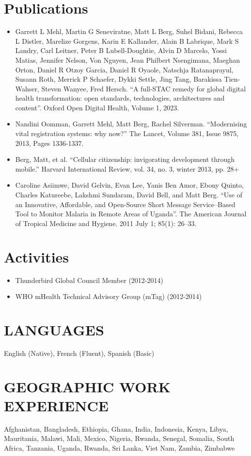 \documentclass{res}
\begin{document}
\begin{resume}
\section{Publications}
\begin{itemize} \itemsep -2pt
	\item Garrett L Mehl, Martin G Seneviratne, Matt L Berg, Suhel Bidani, Rebecca L Distler, Marelize Gorgens, Karin E Kallander, Alain B Labrique, Mark S Landry, Carl Leitner, Peter B Lubell-Doughtie, Alvin D Marcelo, Yossi Matias, Jennifer Nelson, Von Nguyen, Jean Philbert Nsengimana, Maeghan Orton, Daniel R Otzoy Garcia, Daniel R Oyaole, Natschja Ratanaprayul, Susann Roth, Merrick P Schaefer, Dykki Settle, Jing Tang, Barakissa Tien-Wahser, Steven Wanyee, Fred Hersch. ``A full-STAC remedy for global digital health transformation: open standards, technologies, architectures and content''. Oxford Open Digital Health, Volume 1, 2023. 
	\item Nandini Oomman, Garrett Mehl, Matt Berg, Rachel Silverman. ``Modernising vital registration systems: why now?'' The Lancet, Volume 381, Issue 9875, 2013, Pages 1336-1337.
	\item Berg, Matt, et al.  ``Cellular citizenship: invigorating development through mobile.'' Harvard International Review, vol. 34, no. 3, winter 2013, pp. 28+
	\item Caroline Asiimwe, David Gelvin, Evan Lee, Yanis Ben Amor, Ebony Quinto, Charles Katureebe, Lakshmi Sundaram, David Bell, and Matt Berg. ``Use of an Innovative, Affordable, and Open-Source Short Message Service–Based Tool to Monitor Malaria in Remote Areas of Uganda''. The American Journal of Tropical Medicine and Hygiene. 2011 July 1; 85(1): 26–33.
\end{itemize}

\section{Activities}
\begin{itemize} \itemsep -2pt
	\item Thunderbird Global Council Member (2012-2014)
        \item WHO mHealth Technical Advisory Group (mTag) (2012-2014)
\end{itemize}

\section{LANGUAGES} 
\vspace{8pt}
English (Native), French (Fluent), Spanish (Basic)

\section{GEOGRAPHIC WORK EXPERIENCE} 
\vspace{8pt}
Afghanistan, Bangladesh, Ethiopia, Ghana, India, Indonesia, Kenya, Libya, Mauritania, Malawi, Mali, Mexico, Nigeria, Rwanda, Senegal, Somalia, South Africa, Tanzania, Uganda, Rwanda, Sri Lanka, Viet Nam, Zambia, Zimbabwe

\end{resume} 
\end{document}
